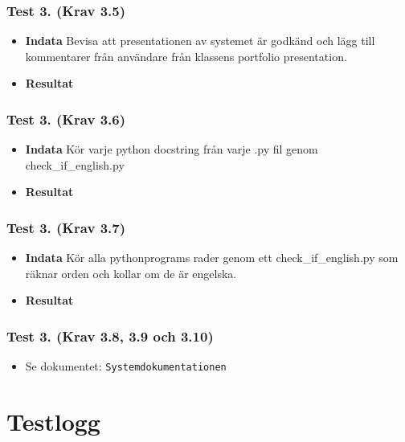 \documentclass{TDP003mall}
\begin{document}
\subsubsection*{Test 3. (Krav 3.5)}
\begin{itemize}
\item[]\textbf{Indata} Bevisa att presentationen av systemet är godkänd och lägg till kommentarer från användare från klassens portfolio presentation.
\item[]\textbf{Resultat} 
\end{itemize}
\subsubsection*{Test 3. (Krav 3.6)}
\begin{itemize}
\item[]\textbf{Indata} Kör varje python docstring från varje .py fil genom check_if_english.py
\item[]\textbf{Resultat} 
\end{itemize}
\subsubsection*{Test 3. (Krav 3.7)}
\begin{itemize}
\item[]\textbf{Indata} Kör alla pythonprograms rader genom ett check_if_english.py som räknar orden och kollar om de är engelska. 
\item[]\textbf{Resultat} 
\end{itemize}
\subsubsection*{Test 3. (Krav 3.8, 3.9 och 3.10)}
\begin{itemize}
\item[] Se dokumentet: \texttt{Systemdokumentationen}
\end{itemize}





\section{Testlogg}
\end{document}
